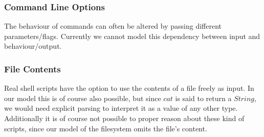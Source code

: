 \documentclass[12pt,a4paper]{article}
\newcommand{\Conid}[1]{\mathit{#1}}
\newcommand{\Varid}[1]{\mathit{#1}}
\begin{document}
\subsubsection{Command Line Options}
The behaviour of commands can often be altered by passing different parameters/flags. Currently we cannot model this dependency between input and behaviour/output. 

\subsubsection{File Contents}
Real shell scripts have the option to use the contents of a file freely as input. In our model this is of course also possible, but since \ensuremath{\Varid{cat}} is said to return a \ensuremath{\Conid{String}}, we would need explicit parsing to interpret it as a value of any other type. Additionally it is of course not possible to proper reason about these kind of scripts, since our model of the filesystem omits the file's content. 
\end{document}
